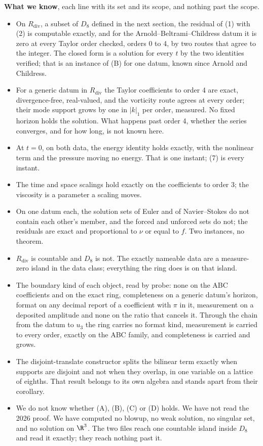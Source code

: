 \textbf{What we know}, each line with its set and its scope, and nothing past the scope.

\begin{itemize}
\item On $R_{\mathrm{div}}$, a subset of $D_8$ defined in the next section, the residual of (1) with
  (2) is computable exactly, and for the Arnold--Beltrami--Childress datum it is zero at every Taylor
  order checked, orders 0 to 4, by two routes that agree to the integer. The closed form is a solution
  for every $t$ by the two identities verified; that is an instance of (B) for one datum, known since
  Arnold and Childress.
\item For a generic datum in $R_{\mathrm{div}}$ the Taylor coefficients to order 4 are exact,
  divergence-free, real-valued, and the vorticity route agrees at every order; their mode support
  grows by one in $|k|_1$ per order, measured. No fixed horizon holds the solution. What happens
  past order 4, whether the series converges, and for how long, is not known here.
\item At $t = 0$, on both data, the energy identity holds exactly, with the nonlinear term and the
  pressure moving no energy. That is one instant; (7) is every instant.
\item The time and space scalings hold exactly on the coefficients to order 3; the viscosity is a
  parameter a scaling moves.
\item On one datum each, the solution sets of Euler and of Navier--Stokes do not contain each other's
  member, and the forced and unforced sets do not; the residuals are exact and proportional to $\nu$
  or equal to $f$. Two instances, no theorem.
\item $R_{\mathrm{div}}$ is countable and $D_8$ is not. The exactly nameable data are a
  measure-zero island in the data class; everything the ring does is on that island.
\item The boundary kind of each object, read by probe: none on the ABC coefficients and on the exact
  ring, completeness on a generic datum's horizon, format on any decimal report of a coefficient with
  $\pi$ in it, measurement on a deposited amplitude and none on the ratio that cancels it. Through the
  chain from the datum to $u_3$ the ring carries no format kind, measurement is carried to every
  order, exactly on the ABC family, and completeness is carried and grows.
\item The disjoint-translate constructor splits the bilinear term exactly when supports are disjoint
  and not when they overlap, in one variable on a lattice of eighths. That result belongs to its own algebra and stands
  apart from their corollary.
\item We do not know whether (A), (B), (C) or (D) holds. We have not read the 2026 proof. We have
  computed no blowup, no weak solution, no singular set, and no solution on $\R^3$. The two files
  reach one countable island inside $D_8$ and read it exactly; they reach nothing past it.
\end{itemize}

